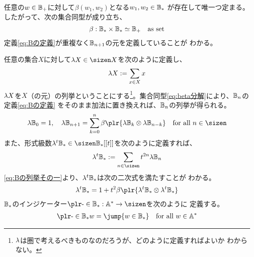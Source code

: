 {	任意の$w\in\mathbb{B}_+$に対して$\beta(w_1,w_2)$となる$w_1,w_2\in\mathbb{B}_*$
	が存在して唯一つ定まる。したがって、次の集合同型が成り立ち、
	\begin{equation}\label{eq:beta分解}\begin{split}
		\beta:\mathbb{B}_*\times\mathbb{B}_*\simeq\mathbb{B}_+ \quad\text{as set}
	\end{split}\end{equation}
	定義\eqref{eq:Bの定義}が重複なく$\mathbb{B}_{n+1}$の元を定義していることが
	わかる。

	任意の集合$X$に対して$\ls X\in\sizen X$を次のように定義し、
	\begin{equation*}\begin{split}
		{\lambda} X := \sum_{x\in X} x
	\end{split}\end{equation*}
	${\lambda} X$を$X$（の元）の列挙ということにする\footnote{
		${\lambda}$は圏で考えるべきものなのだろうが、どのように定義すればよいか
		わからない。
	}。集合同型\eqref{eq:beta分解}により、$\mathbb{B}_n$の定義\eqref{eq:Bの定義}
	をそのまま加法に置き換えれば、$\mathbb{B}_n$の列挙が得られる。
	\begin{equation}\label{eq:Bの列挙その一}\begin{split}
		\ls\setB_0 = 1,\quad \ls\setB_{n+1} 
		= \sum_{k=0}^n \beta\plr{\ls\setB_k\otimes\ls\setB_{n-k}}
		\quad\text{for all } n\in\sizen
	\end{split}\end{equation}
	また、形式級数$\ls^t\setB_*\in\sizen\setB_*[[t]]$を次のように定義すれば、
	\begin{equation*}\begin{split}
		\ls^t\setB_* := \sum_{n\in\sizen} t^{2n}\ls\setB_n
	\end{split}\end{equation*}
	\eqref{eq:Bの列挙その一}より、${\lambda}^t\mathbb{B}_*$は次の二次式を満たすことが
	わかる。
	\begin{equation}\label{eq:Bの列挙その二}\begin{split}
		\ls^t\setB_* = 1 + t^2\beta\plr{\ls^t\setB_*\otimes\ls^t\setB_*}
	\end{split}\end{equation}
	$\mathbb{B}_*$のインジケーター$\isA{\setB_*}:\setA^*\to\sizen$を次のように
	定義する。
	\begin{equation*}\begin{split}
		\isA{\setB_*}w = \jump{w\in\setB_*} \quad\text{for all } w\in\setA^*
	\end{split}\end{equation*}
}
